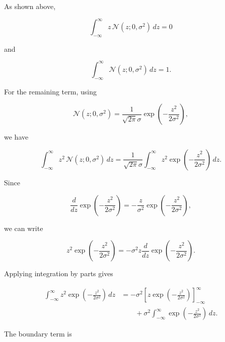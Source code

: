 \documentclass[10pt,twocolumn]{memoir}
\begin{document}
As shown above,

\begin{equation}
    \int_{-\infty}^{\infty}z\,\mathcal{N}(z;0,\sigma^2)\,dz = 0
\end{equation}

and

\begin{equation}
    \int_{-\infty}^{\infty}\mathcal{N}(z;0,\sigma^2)\,dz = 1.
\end{equation}

For the remaining term, using

\begin{equation}
    \mathcal{N}(z;0,\sigma^2) = \frac{1}{\sqrt{2\pi}\sigma} \exp\left(-\frac{z^2}{2\sigma^2}\right),
\end{equation}

we have

\begin{equation}
    \int_{-\infty}^{\infty}
    z^2\,\mathcal{N}(z;0,\sigma^2)\,dz
    =
    \frac{1}{\sqrt{2\pi}\sigma}
    \int_{-\infty}^{\infty}
    z^2
    \exp\left(-\frac{z^2}{2\sigma^2}\right)\,dz.
\end{equation}

Since

\begin{equation}
    \frac{d}{dz}\exp\left(-\frac{z^2}{2\sigma^2}\right) = -\frac{z}{\sigma^2}\exp\left(-\frac{z^2}{2\sigma^2}\right),
\end{equation}

we can write

\begin{equation}
    z^2 \exp\left(-\frac{z^2}{2\sigma^2}\right) = -\sigma^2 z \frac{d}{dz}\exp\left(-\frac{z^2}{2\sigma^2}\right).
\end{equation}

Applying integration by parts gives

\begin{equation}
\begin{aligned}
    \int_{-\infty}^{\infty}
    z^2
    \exp\left(-\frac{z^2}{2\sigma^2}\right)\,dz
    &=
    -\sigma^2
    \left[
    z\exp\left(-\frac{z^2}{2\sigma^2}\right)
    \right]_{-\infty}^{\infty} \\
    &\qquad
    +
    \sigma^2
    \int_{-\infty}^{\infty}
    \exp\left(-\frac{z^2}{2\sigma^2}\right)\,dz.
\end{aligned}
\end{equation}

The boundary term is
\end{document}
